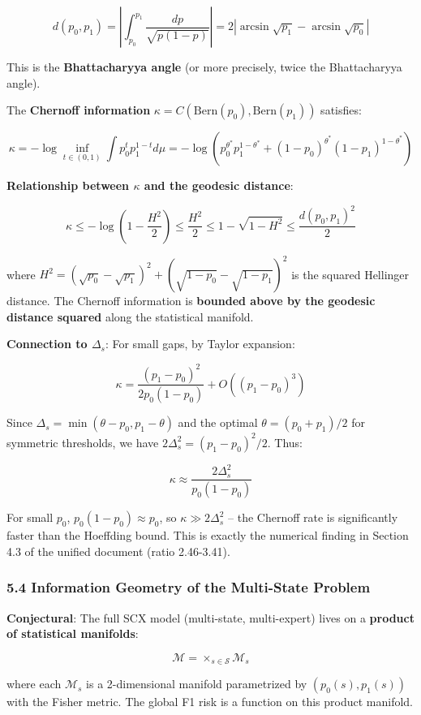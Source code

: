 \documentclass[
  12pt,
]{article}
\begin{document}
\[d(p_0, p_1) = \left|\int_{p_0}^{p_1} \frac{dp}{\sqrt{p(1-p)}}\right| = 2\left|\arcsin\sqrt{p_1} - \arcsin\sqrt{p_0}\right|\]

This is the \textbf{Bhattacharyya angle} (or more precisely, twice the
Bhattacharyya angle).

The \textbf{Chernoff information}
\(\kappa = C(\text{Bern}(p_0), \text{Bern}(p_1))\) satisfies:

\[\kappa = -\log \inf_{t \in (0,1)} \int p_0^t p_1^{1-t} d\mu = -\log\left(p_0^{\theta^*} p_1^{1-\theta^*} + (1-p_0)^{\theta^*} (1-p_1)^{1-\theta^*}\right)\]

\textbf{Relationship between \(\kappa\) and the geodesic distance}:

\[\kappa \leq -\log\left(1 - \frac{H^2}{2}\right) \leq \frac{H^2}{2} \leq 1 - \sqrt{1 - H^2} \leq \frac{d(p_0, p_1)^2}{2}\]

where
\(H^2 = (\sqrt{p_0} - \sqrt{p_1})^2 + (\sqrt{1-p_0} - \sqrt{1-p_1})^2\)
is the squared Hellinger distance. The Chernoff information is
\textbf{bounded above by the geodesic distance squared} along the
statistical manifold.

\textbf{Connection to \(\Delta_s\)}: For small gaps, by Taylor
expansion:

\[\kappa = \frac{(p_1 - p_0)^2}{2p_0(1-p_0)} + O((p_1-p_0)^3)\]

Since \(\Delta_s = \min(\theta - p_0, p_1 - \theta)\) and the optimal
\(\theta = (p_0 + p_1)/2\) for symmetric thresholds, we have
\(2\Delta_s^2 = (p_1 - p_0)^2/2\). Thus:

\[\kappa \approx \frac{2\Delta_s^2}{p_0(1-p_0)}\]

For small \(p_0\), \(p_0(1-p_0) \approx p_0\), so
\(\kappa \gg 2\Delta_s^2\) -- the Chernoff rate is significantly faster
than the Hoeffding bound. This is exactly the numerical finding in
Section 4.3 of the unified document (ratio 2.46-3.41).

\subsubsection{5.4 Information Geometry of the Multi-State
Problem}\label{information-geometry-of-the-multi-state-problem}

\textbf{Conjectural}: The full SCX model (multi-state, multi-expert)
lives on a \textbf{product of statistical manifolds}:

\[\mathcal{M} = \times_{s \in \mathcal{S}} \mathcal{M}_s\]

where each \(\mathcal{M}_s\) is a 2-dimensional manifold parametrized by
\((p_0(s), p_1(s))\) with the Fisher metric. The global F1 risk is a
function on this product manifold.
\end{document}

